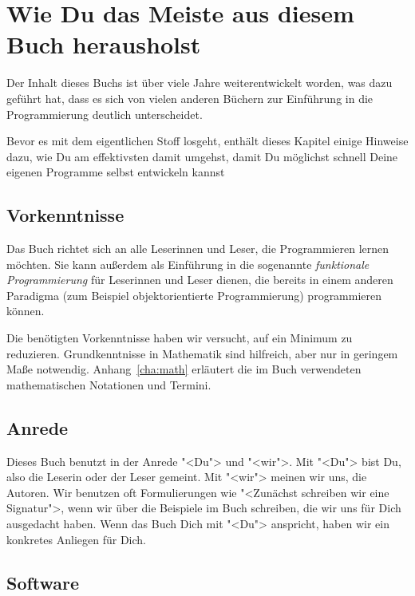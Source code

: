 
\setcounter{chapter}{-1}
\chapter{Wie Du das Meiste aus diesem Buch herausholst}

Der Inhalt dieses Buchs ist über viele Jahre weiterentwickelt worden,
was dazu geführt hat, dass es sich von vielen anderen Büchern zur
Einführung in die Programmierung deutlich unterscheidet.

Bevor es mit dem eigentlichen Stoff losgeht, enthält dieses Kapitel
einige Hinweise dazu, wie Du am effektivsten damit umgehst, damit Du
möglichst schnell Deine eigenen Programme selbst entwickeln kannst

\section{Vorkenntnisse}

Das Buch richtet sich an alle Leserinnen und Leser, die Programmieren
lernen möchten.  Sie kann außerdem als Einführung in die sogenannte
\textit{funktionale Programmierung} für Leserinnen und Leser dienen,
die bereits in einem anderen Paradigma (zum Beispiel objektorientierte
Programmierung) programmieren können.

Die benötigten Vorkenntnisse haben wir versucht, auf ein Minimum zu
reduzieren.  Grundkenntnisse in Mathematik sind hilfreich, aber nur in
geringem Maße notwendig.  Anhang~\ref{cha:math} erläutert die im Buch
verwendeten mathematischen Notationen und Termini.

\section{Anrede}

Dieses Buch benutzt in der Anrede "<Du"> und "<wir">.  Mit "<Du"> bist
Du, also die Leserin oder der Leser gemeint.  Mit "<wir"> meinen wir
uns, die Autoren.  Wir benutzen oft Formulierungen wie "<Zunächst
schreiben wir eine Signatur">, wenn wir über die Beispiele im Buch
schreiben, die wir uns für Dich ausgedacht haben.  Wenn das Buch Dich
mit "<Du"> anspricht, haben wir ein konkretes Anliegen für Dich.

\section{Software}

